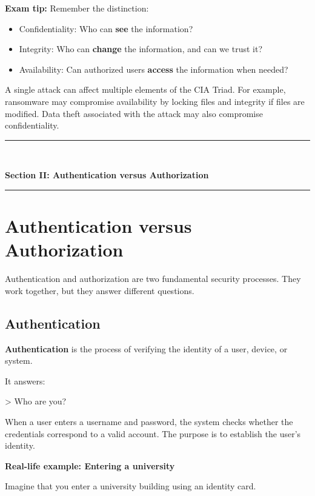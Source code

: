 \textbf{Exam tip:} Remember the distinction:

\begin{itemize}
\item Confidentiality: Who can \textbf{see} the information?
\item Integrity: Who can \textbf{change} the information, and can we trust it?
\item Availability: Can authorized users \textbf{access} the information when needed?
\end{itemize}

A single attack can affect multiple elements of the CIA Triad. For example, ransomware may compromise availability by locking files and integrity if files are modified. Data theft associated with the attack may also compromise confidentiality.


\newpage
\begin{center}
\vspace{0.5em}
{\color{primary}\rule{0.45\textwidth}{1.2pt}\\[4pt]}
{\Large\bfseries\color{primary} Section II: Authentication versus Authorization\\[2pt]}
{\color{primary}\rule{0.45\textwidth}{1.2pt}}
\vspace{0.5em}
\end{center}

\section{Authentication versus Authorization}


Authentication and authorization are two fundamental security processes. They work together, but they answer different questions.

\subsection{Authentication}

\textbf{Authentication} is the process of verifying the identity of a user, device, or system.

It answers:

> Who are you?

When a user enters a username and password, the system checks whether the credentials correspond to a valid account. The purpose is to establish the user's identity.

\textbf{Real-life example: Entering a university}

Imagine that you enter a university building using an identity card.

